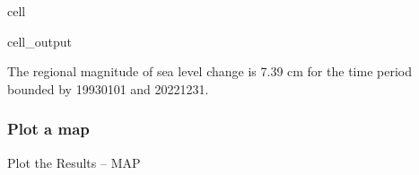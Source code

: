 \documentclass[letterpaper,10pt,english]{jupyterBook}
\begin{document}
\begin{sphinxuseclass}{cell}
\begin{sphinxVerbatimOutput}
\begin{sphinxuseclass}{cell_output}
\begin{sphinxVerbatim}[commandchars=\\\{\}]
The regional magnitude of sea level change is 7.39 cm for the time period bounded by 1993\PYGZhy{}01\PYGZhy{}01 and 2022\PYGZhy{}12\PYGZhy{}31.
\end{sphinxVerbatim}

\end{sphinxuseclass}\end{sphinxVerbatimOutput}

\end{sphinxuseclass}

\subsubsection{Plot a map}
\label{\detokenize{notebooks/regional_and_local/SL_Trend:plot-a-map}}
\sphinxAtStartPar
Plot the Results – MAP
\end{document}
